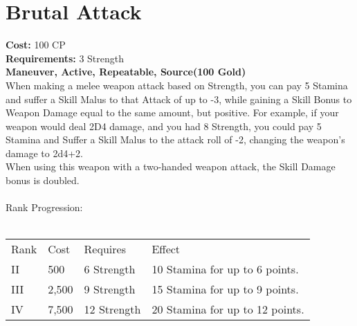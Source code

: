\section{Brutal Attack}\label{maneuver:brutalAttack}
\textbf{Cost:} 100 CP\\
\textbf{Requirements:} 3 Strength\\
\textbf{Maneuver, Active, Repeatable, Source(100 Gold)}\\
When making a melee weapon attack based on Strength, you can pay 5 Stamina and suffer a Skill Malus to that Attack of up to -3, while gaining a Skill Bonus to Weapon Damage equal to the same amount, but positive.
For example, if your weapon would deal 2D4 damage, and you had 8 Strength, you could pay 5 Stamina and Suffer a Skill Malus to the attack roll of -2, changing the weapon's damage to 2d4+2.\\
When using this weapon with a two-handed weapon attack, the Skill Damage bonus is doubled.\\
\\
Rank Progression:\\
\\
\begin{tabular}{l | l | l | l}
	Rank & Cost & Requires & Effect\\
	II & 500 & 6 Strength & 10 Stamina for up to 6 points.\\
	III & 2,500 & 9 Strength & 15 Stamina for up to 9 points.\\
	IV & 7,500 & 12 Strength & 20 Stamina for up to 12 points.\\
\end{tabular}